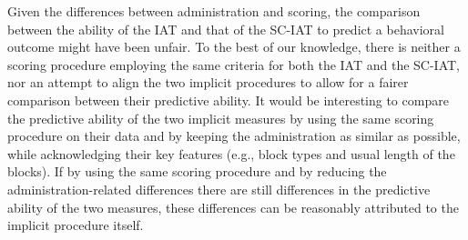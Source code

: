 \documentclass[12pt]{book}
\begin{document}

Given the differences between administration and scoring, the comparison between the ability of the IAT and that of the SC-IAT to predict a behavioral outcome might have been unfair. To the best of our knowledge, there is neither a scoring procedure employing the same criteria for both the IAT and the SC-IAT, nor an attempt to align the two implicit procedures to allow for a fairer comparison between their predictive ability. 
It would be interesting to compare the predictive ability of the two implicit measures by using the same scoring procedure on their data and by keeping the administration as similar as possible, while acknowledging their key features (e.g., block types and usual length of the blocks). 
If by using the same scoring procedure and by reducing the administration-related differences there are still differences in the predictive ability of the two measures, these differences can be reasonably attributed to the implicit procedure itself.
\end{document}
